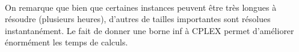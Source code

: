 \documentclass[a4paper, 11pt]{article} %
\begin{document}
\paragraph*{}
On remarque que bien que certaines instances peuvent être très longues à résoudre (plusieurs heures), d'autres de tailles importantes sont résolues instantanément. Le fait de donner une borne inf à CPLEX permet d'améliorer énormément les temps de calculs.

\begin{comment}
\begin{center}
\begin{tabular}{|c|c|c|c|}
  \hline 
  Instance & Glouton & Recuit & Fourmis \\ \hline
  $5\_8\_1$ &  & &  \\ \hline 
  $5\_8\_2$ &  & &  \\ \hline 
  $5\_8\_3$ &  & &  \\ \hline 
  $5\_8\_4$ &  & &  \\ \hline 
  $5\_8\_5$ &  & &  \\ \hline 
  $5\_8\_6$ &  & &  \\ \hline 
  $5\_8\_7$ &  & &  \\ \hline 
  $5\_8\_8$ &  & &  \\ \hline 
  $5\_8\_9$ &  & &  \\ \hline 
  $5\_8\_10$ &  & &  \\ \hline 
  
  $12\_10\_1$ &  & &  \\ \hline
  $12\_10\_2$ &  & & \\ \hline
  $12\_10\_3$ &  & &  \\ \hline
  $12\_10\_4$ &  & &  \\ \hline
  $12\_10\_5$ &  & &  \\ \hline
  $12\_10\_6$ &  & &  \\ \hline
  $12\_10\_7$ &  & &  \\ \hline
  $12\_10\_8$ &  & &  \\ \hline
  $12\_10\_9$ &  & &  \\ \hline
  $12\_10\_10$ &  & &  \\ \hline
  
  $15\_17\_1$ &  & &  \\ \hline
  $15\_17\_2$ &  & &  \\ \hline
  $15\_17\_3$ &  & &  \\ \hline
  $15\_17\_4$ &  & &  \\ \hline
  $15\_17\_5$ &  & &  \\ \hline
  $15\_17\_6$ &  & &  \\ \hline
  $15\_17\_7$ &  & &  \\ \hline
  $15\_17\_8$ &  & &  \\ \hline
  $15\_17\_9$ &  & & \\ \hline
  $15\_17\_10$ &  & &  \\ \hline
   

\end{comment}
\end{document}
